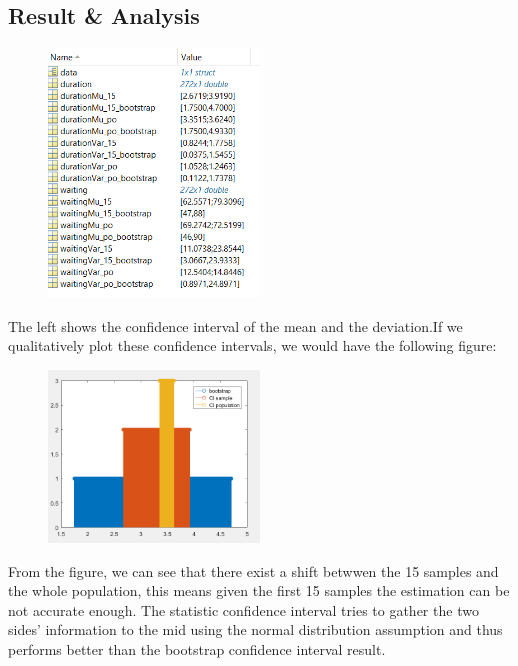 \documentclass[twoside]{article}
\begin{document}
\subsection{\normalsize{Result \& Analysis}}
\begin{multicols}{2}
\begin{figure}[H]
   \centering
   \includegraphics[width = 0.5\textwidth]{../data/data.png}  
\end{figure}
The left shows the confidence interval of the mean and the deviation.If we qualitatively plot these confidence intervals, we would have the following figure: \\
\begin{figure}[H]
   \centering
   \includegraphics[width = 0.5\textwidth]{../data/analyse6.png}  
\end{figure}
\end{multicols}
From the figure, we can see that there exist a shift betwwen the 15 samples and the whole population, this means given the first 15 samples the estimation can be not accurate enough.  The statistic confidence interval tries to gather the two sides' information to the mid using the normal distribution assumption and thus performs better than the bootstrap confidence interval result.
\end{document}
